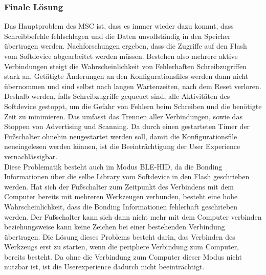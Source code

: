 \subsubsection{Finale Lösung}
Das Hauptproblem des \ac{MSC} ist, dass es immer wieder dazu kommt, dass Schreibbefehle fehlschlagen und die Daten unvollständig in den Speicher übertragen werden. Nachforschungen ergeben, dass die Zugriffe auf den Flash vom Softdevice abgearbeitet werden müssen. Bestehen also mehrere aktive Verbindungen steigt die Wahrscheinlichkeit von Fehlerhaften Schreibzugriffen stark an. Getätigte Änderungen an den Konfigurationsfiles werden dann nicht übernommen und sind selbst nach langen Wartenzeiten, nach dem Reset verloren. Deshalb werden, falls Schreibzugriffe gequeuet sind, alle Aktivitäten des Softdevice gestoppt, um die Gefahr von Fehlern beim Schreiben und die benötigte Zeit zu minimieren. Das umfasst das Trennen aller Verbindungen, sowie das Stoppen von Advertising und Scanning. Da durch einen gestarteten Timer der Fußschalter ohnehin neugestartet werden soll, damit die Konfigurationsfile neueingelesen werden können, ist die Beeinträchtigung der User Experience vernachlässigbar.\\
Diese Problematik besteht auch im Modus \ac{BLE}-\ac{HID}, da die Bonding Informationen über die selbe Library vom Softdevice in den Flash geschrieben werden. Hat sich der Fußschalter zum Zeitpunkt des Verbindens mit dem Computer bereits mit mehreren Werkzeugen verbunden, besteht eine hohe Wahrscheinlichkeit, dass die Bonding Informationen fehlerhaft geschrieben werden. Der Fußschalter kann sich dann nicht mehr mit dem Computer verbinden beziehungsweise kann keine Zeichen bei einer bestehenden Verbindung übertragen. Die Lösung dieses Problems besteht darin, das Verbinden des Werkzeugs erst zu starten, wenn die periphere Verbindung zum Computer, bereits besteht. Da ohne die Verbindung zum Computer dieser Modus nicht nutzbar ist, ist die Userexperience dadurch nicht beeinträchtigt.
